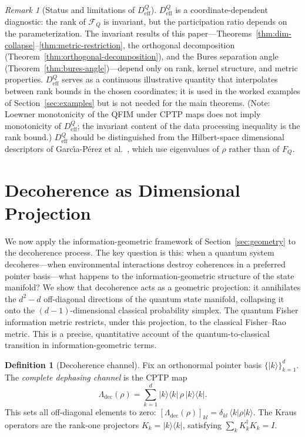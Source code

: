 \documentclass[12pt,a4paper]{article}
\theoremstyle{definition}
\newtheorem{definition}[theorem]{Definition}
\theoremstyle{remark}
\newtheorem{remark}[theorem]{Remark}
\begin{document}
\begin{remark}[Status and limitations of $D_{\mathrm{eff}}^Q$]
\label{rem:deff-status}
$D_{\mathrm{eff}}^Q$ is a coordinate-dependent diagnostic: the rank of $\mathcal{F}_Q$ is invariant, but the participation ratio depends on the parameterization.  The invariant results of this paper---Theorems~\ref{thm:dim-collapse}--\ref{thm:metric-restriction}, the orthogonal decomposition (Theorem~\ref{thm:orthogonal-decomposition}), and the Bures separation angle (Theorem~\ref{thm:bures-angle})---depend only on rank, kernel structure, and metric properties.  $D_{\mathrm{eff}}^Q$ serves as a continuous illustrative quantity that interpolates between rank bounds in the chosen coordinates; it is used in the worked examples of Section~\ref{sec:examples} but is not needed for the main theorems.  (Note: Loewner monotonicity of the QFIM under CPTP maps does not imply monotonicity of $D_{\mathrm{eff}}^Q$; the invariant content of the data processing inequality is the rank bound.)  $D_{\mathrm{eff}}^Q$ should be distinguished from the Hilbert-space dimensional descriptors of Garc\'{\i}a-P\'{e}rez et al.\ \cite{garcia2023descriptors}, which use eigenvalues of $\rho$ rather than of $F_Q$.
\end{remark}

\section{Decoherence as Dimensional Projection}
\label{sec:decoherence}
We now apply the information-geometric framework of Section~\ref{sec:geometry} to the decoherence process. The key question is this: when a quantum system decoheres---when environmental interactions destroy coherences in a preferred pointer basis---what happens to the information-geometric structure of the state manifold? We show that decoherence acts as a geometric projection: it annihilates the $d^2 - d$ off-diagonal directions of the quantum state manifold, collapsing it onto the $(d-1)$-dimensional classical probability simplex. The quantum Fisher information metric restricts, under this projection, to the classical Fisher--Rao metric. This is a precise, quantitative account of the quantum-to-classical transition in information-geometric terms.

\begin{definition}[Decoherence channel]
\label{def:decoherence-channel}
Fix an orthonormal pointer basis $\{|k\rangle\}_{k=1}^d$. The \emph{complete dephasing channel} is the CPTP map
\begin{equation}
\label{eq:dephasing}
\Lambda_{\mathrm{dec}}(\rho) = \sum_{k=1}^d |k\rangle\langle k|\, \rho\, |k\rangle\langle k|.
\end{equation}
This sets all off-diagonal elements to zero: $[\Lambda_{\mathrm{dec}}(\rho)]_{kl} = \delta_{kl}\, \langle k|\rho|k\rangle$. The Kraus operators are the rank-one projectors $K_k = |k\rangle\langle k|$, satisfying $\sum_k K_k^\dagger K_k = I$.
\end{definition}
\end{document}
